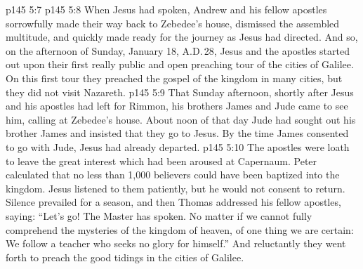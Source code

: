 \vs p145 5:7 
\vs p145 5:8 When Jesus had spoken, Andrew and his fellow apostles sorrowfully made their way back to Zebedee’s house, dismissed the assembled multitude, and quickly made ready for the journey as Jesus had directed. And so, on the afternoon of Sunday, January 18, A.D.\,28, Jesus and the apostles started out upon their first really public and open preaching tour of the cities of Galilee. On this first tour they preached the gospel of the kingdom in many cities, but they did not visit Nazareth.
\vs p145 5:9 That Sunday afternoon, shortly after Jesus and his apostles had left for Rimmon, his brothers James and Jude came to see him, calling at Zebedee’s house. About noon of that day Jude had sought out his brother James and insisted that they go to Jesus. By the time James consented to go with Jude, Jesus had already departed.
\vs p145 5:10 The apostles were loath to leave the great interest which had been aroused at Capernaum. Peter calculated that no less than 1,000 believers could have been baptized into the kingdom. Jesus listened to them patiently, but he would not consent to return. Silence prevailed for a season, and then Thomas addressed his fellow apostles, saying: “Let’s go! The Master has spoken. No matter if we cannot fully comprehend the mysteries of the kingdom of heaven, of one thing we are certain: We follow a teacher who seeks no glory for himself.” And reluctantly they went forth to preach the good tidings in the cities of Galilee.
\quizlink
